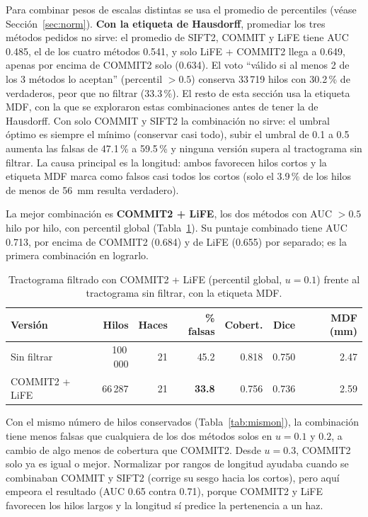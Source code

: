 \documentclass[11pt,a4paper]{article}
\begin{document}
Para combinar pesos de escalas distintas se usa el promedio de percentiles
(véase Secci\'on~\ref{sec:norm}). \textbf{Con la etiqueta de Hausdorff}, promediar los tres
m\'etodos pedidos no sirve: el promedio de SIFT2, COMMIT y LiFE tiene AUC 0.485, el de los
cuatro m\'etodos 0.541, y solo LiFE + COMMIT2 llega a 0.649, apenas por encima de COMMIT2 solo
(0.634). El voto ``v\'alido si al menos 2 de los 3 m\'etodos lo aceptan'' (percentil $>0.5$)
conserva 33\,719 hilos con 30.2\,\% de verdaderos, peor que no filtrar (33.3\,\%). El resto de
esta secci\'on usa la etiqueta MDF, con la que se exploraron estas combinaciones antes de
tener la de Hausdorff. Con solo COMMIT y SIFT2 la combinaci\'on no sirve: el umbral \'optimo es
siempre el m\'inimo (conservar casi todo), subir el umbral de 0.1 a 0.5 aumenta las falsas
de 47.1\,\% a 59.5\,\% y ninguna versi\'on supera al tractograma sin filtrar. La causa
principal es la longitud: ambos favorecen hilos cortos y la etiqueta MDF marca como falsos
casi todos los cortos (solo el 3.9\,\% de los hilos de menos de 56~mm resulta verdadero).

La mejor combinaci\'on es \textbf{COMMIT2 + LiFE}, los dos m\'etodos con AUC $>0.5$ hilo por
hilo, con percentil global (Tabla~\ref{tab:combo}). Su puntaje combinado tiene AUC 0.713, por
encima de COMMIT2 (0.684) y de LiFE (0.655) por separado; es la primera combinaci\'on en
lograrlo.

\begin{table}[H]
\centering
\small
\begin{tabularx}{\textwidth}{@{}Xrrrrrr@{}}
\toprule
\textbf{Versi\'on} & \textbf{Hilos} & \textbf{Haces} & \textbf{\% falsas} & \textbf{Cobert.} & \textbf{Dice} & \textbf{MDF (mm)}\\
\midrule
Sin filtrar        & 100\,000 & 21 & 45.2 & 0.818 & 0.750 & 2.47\\
COMMIT2 + LiFE     & 66\,287  & 21 & \textbf{33.8} & 0.756 & 0.736 & 2.59\\
\bottomrule
\end{tabularx}
\caption{Tractograma filtrado con COMMIT2 + LiFE (percentil global, $u=0.1$) frente al
tractograma sin filtrar, con la etiqueta MDF.}
\label{tab:combo}
\end{table}

Con el mismo n\'umero de hilos conservados (Tabla~\ref{tab:mismon}), la combinaci\'on tiene
menos falsas que cualquiera de los dos m\'etodos solos en $u=0.1$ y $0.2$, a cambio de algo
menos de cobertura que COMMIT2. Desde $u=0.3$, COMMIT2 solo ya es igual o mejor.
Normalizar por rangos de longitud ayudaba cuando se combinaban COMMIT y SIFT2 (corrige su
sesgo hacia los cortos), pero aqu\'i empeora el resultado (AUC 0.65 contra 0.71), porque
COMMIT2 y LiFE favorecen los hilos largos y la longitud s\'i predice la pertenencia a un
haz.
\end{document}

